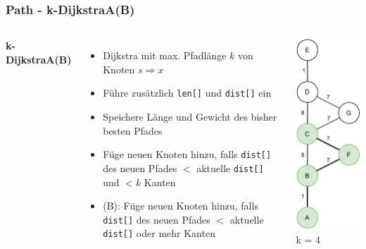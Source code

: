 \documentclass[aspectratio=169]{beamer}
\begin{document}
\begin{frame}
	\frametitle{Path - k-DijkstraA(B)}
	\begin{columns}[c] %
		
		\textbf{k-DijkstraA(B)}
		\begin{itemize}
			\item Dijkstra mit max. Pfadlänge $k$ von Knoten $s \Rightarrow x$
			\item Führe zusätzlich \texttt{len[]} und \texttt{dist[]} ein
			\item Speichere Länge und Gewicht des bisher besten Pfades
			\item Füge neuen Knoten hinzu, falls \texttt{dist[]} des neuen Pfades $<$ aktuelle \texttt{dist[]} und $<k$ Kanten
			\item (B): Füge neuen Knoten hinzu, falls \texttt{dist[]} des neuen Pfades $<$ aktuelle \texttt{dist[]} oder mehr Kanten
		\end{itemize}
		\includegraphics[scale=.6]{path_dijkstraAB.pdf}
		k = 4\\
		
		
	\end{columns}
	\end{frame}
	
\end{document}
